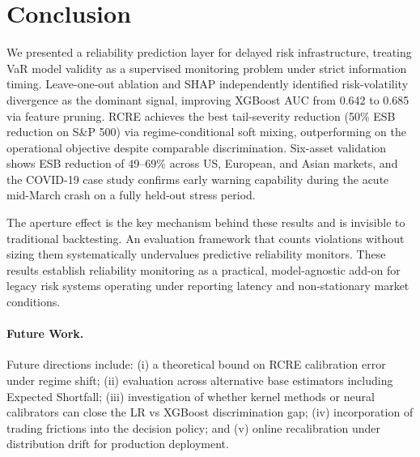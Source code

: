 \documentclass[sigconf]{acmart}
\begin{document}
\section{Conclusion}

We presented a reliability prediction layer for delayed risk
infrastructure, treating VaR model validity as a supervised monitoring
problem under strict information timing. Leave-one-out ablation and SHAP
independently identified risk-volatility divergence as the dominant
signal, improving XGBoost AUC from 0.642 to 0.685 via feature pruning. RCRE achieves the best tail-severity reduction (50\% ESB reduction on S\&P 500) via regime-conditional soft mixing, outperforming on the operational objective despite comparable discrimination. Six-asset validation shows ESB reduction of 49--69\% across US, European, and Asian markets, and the COVID-19 case study confirms early warning capability during the acute mid-March crash on a fully held-out stress period.

The aperture effect is the key mechanism behind these results and is invisible to traditional backtesting. An evaluation framework that counts violations without sizing them systematically undervalues predictive reliability monitors. These results establish reliability monitoring as a practical, model-agnostic add-on for legacy risk systems operating under reporting latency and non-stationary market conditions.

\paragraph{Future Work.} Future directions include: (i) a theoretical bound on RCRE calibration error under regime shift; (ii) evaluation across alternative base estimators including Expected Shortfall; (iii) investigation of whether kernel methods or neural calibrators can close the LR vs XGBoost discrimination gap; (iv) incorporation of trading frictions into the decision policy; and (v) online recalibration under distribution drift for production deployment.
\end{document}
